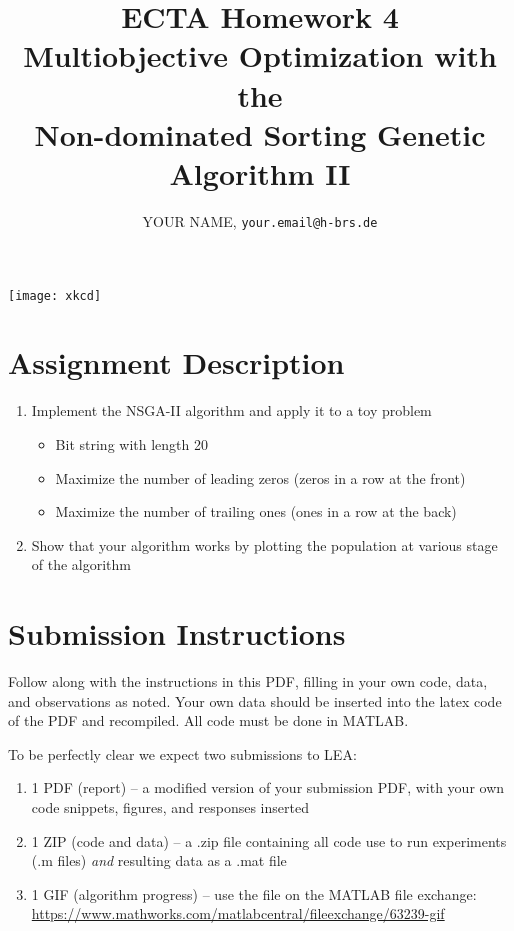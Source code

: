 \documentclass{article}
\title{ECTA Homework 4\\Multiobjective Optimization with the\\Non-dominated Sorting Genetic Algorithm II}
\author{\color{red}YOUR NAME, \texttt{your.email@h-brs.de}}
\begin{document}
\maketitle

\begin{center}
	\begin{minipage}{1\linewidth}
		\begin{center}
			\texttt{[image: xkcd]}
		\end{center}
	\end{minipage}
\end{center}

\newpage

\section{Assignment Description}
	\begin{enumerate}
		\item Implement the NSGA-II algorithm and apply it to a toy problem
			\begin{itemize}
			\item Bit string with length 20
			\item Maximize the number of leading zeros (zeros in a row at the front)
			\item Maximize the number of trailing ones (ones in a row at the back)
		\end{itemize}
		\item Show that your algorithm works by plotting the population at various stage of the algorithm
	\end{enumerate}

\section{Submission Instructions}
Follow along with the instructions in this PDF, filling in your own code, data, and observations as noted. Your own data should be inserted into the latex code of the PDF and recompiled. All code must be done in MATLAB.

To be perfectly clear we expect two submissions to LEA:
\begin{enumerate}
	\item 1 PDF (report) -- a modified version of your submission PDF, with your own code snippets, figures, and responses inserted
	\item 1 ZIP (code and data)   -- a .zip file containing all code use to run experiments (.m files) \textit{and} resulting data as a .mat file
	\item 1 GIF (algorithm progress) -- use the file on the MATLAB file exchange: \url{https://www.mathworks.com/matlabcentral/fileexchange/63239-gif}
\end{enumerate}
\end{document}
